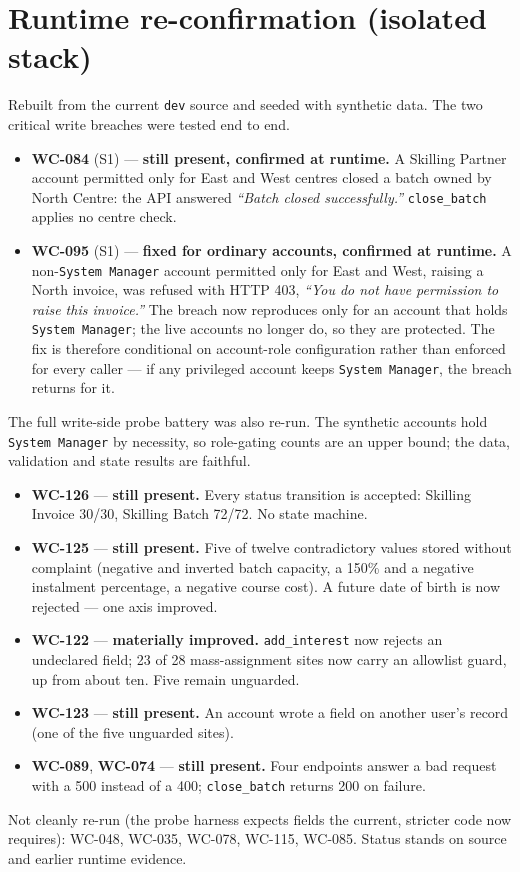 \documentclass[11pt]{article}
\newcommand{\wc}[1]{\mbox{WC-#1}}
\begin{document}
\section{Runtime re-confirmation (isolated stack)}
Rebuilt from the current \texttt{dev} source and seeded with synthetic data. The two critical
write breaches were tested end to end.
\begin{itemize}
  \item \textbf{\wc{084}} (S1) --- \textbf{still present, confirmed at runtime.} A Skilling Partner
        account permitted only for East and West centres closed a batch owned by North Centre: the
        API answered \emph{``Batch closed successfully.''} \texttt{close\_batch} applies no centre
        check.
  \item \textbf{\wc{095}} (S1) --- \textbf{fixed for ordinary accounts, confirmed at runtime.} A
        non-\texttt{System~Manager} account permitted only for East and West, raising a North
        invoice, was refused with HTTP 403, \emph{``You do not have permission to raise this
        invoice.''} The breach now reproduces only for an account that holds \texttt{System~Manager};
        the live accounts no longer do, so they are protected. The fix is therefore conditional on
        account-role configuration rather than enforced for every caller --- if any privileged
        account keeps \texttt{System~Manager}, the breach returns for it.
\end{itemize}
The full write-side probe battery was also re-run. The synthetic accounts hold \texttt{System~Manager}
by necessity, so role-gating counts are an upper bound; the data, validation and state results are
faithful.
\begin{itemize}
  \item \textbf{\wc{126}} --- \textbf{still present.} Every status transition is accepted: Skilling
        Invoice 30/30, Skilling Batch 72/72. No state machine.
  \item \textbf{\wc{125}} --- \textbf{still present.} Five of twelve contradictory values stored
        without complaint (negative and inverted batch capacity, a 150\% and a negative instalment
        percentage, a negative course cost). A future date of birth is now rejected --- one axis
        improved.
  \item \textbf{\wc{122}} --- \textbf{materially improved.} \texttt{add\_interest} now rejects an
        undeclared field; 23 of 28 mass-assignment sites now carry an allowlist guard, up from about
        ten. Five remain unguarded.
  \item \textbf{\wc{123}} --- \textbf{still present.} An account wrote a field on another user's
        record (one of the five unguarded sites).
  \item \textbf{\wc{089}}, \textbf{\wc{074}} --- \textbf{still present.} Four endpoints answer a bad
        request with a 500 instead of a 400; \texttt{close\_batch} returns 200 on failure.
\end{itemize}
Not cleanly re-run (the probe harness expects fields the current, stricter code now requires):
\wc{048}, \wc{035}, \wc{078}, \wc{115}, \wc{085}. Status stands on source and earlier runtime
evidence.
\end{document}
